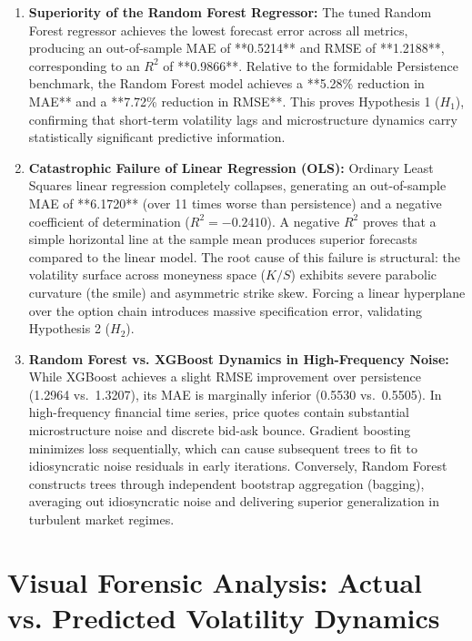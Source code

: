 \begin{enumerate}
    \item \textbf{Superiority of the Random Forest Regressor:}
    The tuned Random Forest regressor achieves the lowest forecast error across all metrics, producing an out-of-sample MAE of **0.5214** and RMSE of **1.2188**, corresponding to an $R^2$ of **0.9866**. Relative to the formidable Persistence benchmark, the Random Forest model achieves a **5.28\% reduction in MAE** and a **7.72\% reduction in RMSE**. This proves Hypothesis 1 ($H_1$), confirming that short-term volatility lags and microstructure dynamics carry statistically significant predictive information.

    \item \textbf{Catastrophic Failure of Linear Regression (OLS):}
    Ordinary Least Squares linear regression completely collapses, generating an out-of-sample MAE of **6.1720** (over 11 times worse than persistence) and a negative coefficient of determination ($R^2 = -0.2410$). A negative $R^2$ proves that a simple horizontal line at the sample mean produces superior forecasts compared to the linear model. The root cause of this failure is structural: the volatility surface across moneyness space ($K/S$) exhibits severe parabolic curvature (the smile) and asymmetric strike skew. Forcing a linear hyperplane over the option chain introduces massive specification error, validating Hypothesis 2 ($H_2$).

    \item \textbf{Random Forest vs. XGBoost Dynamics in High-Frequency Noise:}
    While XGBoost achieves a slight RMSE improvement over persistence (1.2964 vs.\ 1.3207), its MAE is marginally inferior (0.5530 vs.\ 0.5505). In high-frequency financial time series, price quotes contain substantial microstructure noise and discrete bid-ask bounce. Gradient boosting minimizes loss sequentially, which can cause subsequent trees to fit to idiosyncratic noise residuals in early iterations. Conversely, Random Forest constructs trees through independent bootstrap aggregation (bagging), averaging out idiosyncratic noise and delivering superior generalization in turbulent market regimes.
\end{enumerate}

\section{Visual Forensic Analysis: Actual vs. Predicted Volatility Dynamics}
\label{sec:visual_forensics}

